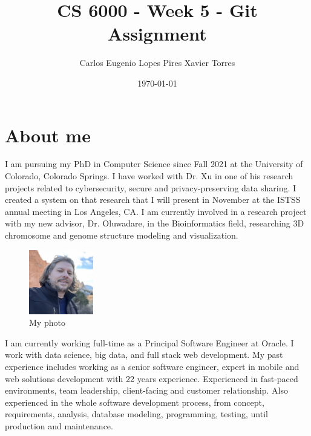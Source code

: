 \hypersetup{colorlinks=true, urlcolor=blue, linkcolor=black}

\newcommand{\myfullname}{Carlos Eugenio Lopes Pires Xavier Torres}
\newcommand{\myshortname}{Carlos E. Torres}

\title{CS 6000 - Week 5 - Git Assignment}
\author{\myfullname}
\date{\today}

\maketitle

\section{About me}

I am pursuing my PhD in Computer Science since Fall 2021 at the University of Colorado, Colorado Springs. I have worked with Dr. Xu in one of his research projects related to cybersecurity, secure and privacy-preserving data sharing. I created a system on that research that I will present in November at the ISTSS annual meeting in Los Angeles, CA.
I am currently involved in a research project with my new advisor, Dr. Oluwadare, in the Bioinformatics field, researching 3D chromosome and genome structure modeling and visualization.

\begin{figure}
    \centering
    \includegraphics[width=0.25\textwidth]{Torres-F23-photo.jpg}
    \caption{\small My photo}
\end{figure}

I am currently working full-time as a Principal Software Engineer at Oracle. I work with data science, big data, and full stack web development. My past experience includes working as a senior software engineer, expert in mobile and web solutions development with 22 years experience. Experienced in fast-paced environments, team leadership, client-facing and customer relationship. Also experienced in the whole software development process, from concept, requirements, analysis, database modeling, programming, testing, until production and maintenance.

